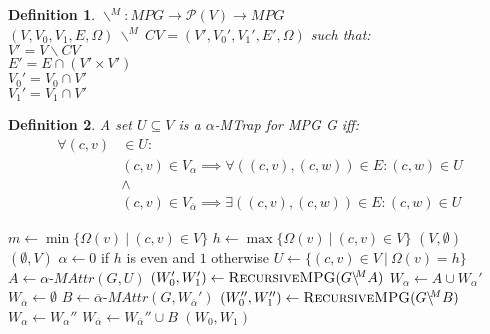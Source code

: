 \documentclass[]{article}
\newtheorem{definition}{Definition}[section]
\begin{document}
	\begin{definition}
		\label{def_subgame}
		$\backslash^{\!\!M} : \textit{MPG} \rightarrow \mathcal{P}(V) \rightarrow \textit{MPG}$\\
		$(V, V_0, V_1, E, \Omega)\ \backslash^{\!\!M}\ CV = (V', V_0', V_1', E', \Omega)$ such that:\\
		$V' = V \backslash CV$\\
		$E' = E \cap (V' \times V')$\\
		$V_0' = V_0 \cap V'$\\
		$V_1' = V_1 \cap V'$
	\end{definition}
\begin{definition}
	\label{def_MTrap}
	A set $U \subseteq V$ is a $\alpha$-MTrap for MPG G iff:
\begin{align*}
\forall(c,v) &\in U:\\
&(c,v) \in V_\alpha \implies \forall((c,v),(c,w)) \in E : (c,w) \in U\\
&\wedge\\
&(c,v) \in V_{\overline{\alpha}} \implies \exists ((c,v),(c,w)) \in E : (c,w) \in U
\end{align*}
\end{definition}
\begin{algorithm}[h]
\caption{$\textsc{RecursiveMPG}(\textit{MPG } G = (V,V_0,V_1, E, \Omega)$}
\begin{algorithmic}[1]
	\State $m \gets \min\{ \Omega(v)\ |\ (c,v) \in V\}$
	\State $h \gets\max\{ \Omega(v)\ |\ (c,v) \in V\}$
	\State \Return $(V,\emptyset)$
	\Else
	\State \Return $(\emptyset, V)$
	\EndIf
	\EndIf
	\State $\alpha \gets 0$ if $h$ is even and $1$ otherwise
	\State $U \gets \{(c,v) \in V\ |\ \Omega(v) = h\}$
	\State $A \gets \alpha\textit{-MAttr}(G, U)$
	\State $(W_0', W_1') \gets \textsc{RecursiveMPG}(G \backslash^{\!\!M} A)$
	\State $W_\alpha \gets A \cup W_\alpha'$
	\State $W_{\overline{\alpha}} \gets \emptyset$
	\Else
	\State $B \gets \overline{\alpha}\textit{-MAttr}(G,W_{\overline{\alpha}}')$
	\State $(W_0'', W_1'') \gets \textsc{RecursiveMPG}(G \backslash^{\!\!M} B)$
	\State $W_\alpha \gets W_\alpha''$
	\State $W_{\overline{\alpha}} \gets W_{\overline{\alpha}}'' \cup B$
	\EndIf
	\State \Return $(W_0, W_1)$
\end{algorithmic}
\end{algorithm}
%

 

\end{document}
